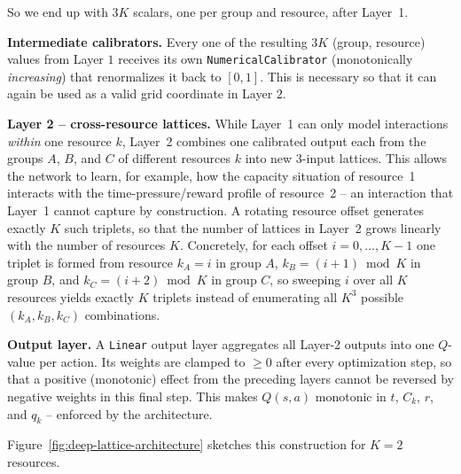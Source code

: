 So we end up with $3K$ scalars, one per group and resource, after Layer~1. 

\textbf{Intermediate calibrators.} Every one of the resulting $3K$ (group, resource) values from
Layer $1$ receives its own \texttt{NumericalCalibrator} (monotonically \emph{increasing}) that
renormalizes it back to $[0,1]$. This is necessary so that it can again be used as a valid grid
coordinate in Layer $2$.

\textbf{Layer 2 -- cross-resource lattices.} While Layer~1 can only model interactions
\emph{within} one resource $k$, Layer~2 combines one calibrated output each from the
groups $A$, $B$, and $C$ of different resources $k$ into new 3-input lattices. This allows the
network to learn, for example, how the capacity situation of resource~1 interacts with the
time-pressure/reward profile of resource~2 -- an interaction that Layer~1 cannot capture by
construction. A rotating resource offset generates exactly $K$ such triplets, so that the number of
lattices in Layer~2 grows linearly with the number of resources $K$. Concretely, for each offset
$i=0,\dots,K-1$ one triplet is formed from resource $k_A=i$ in group $A$, $k_B=(i+1)\bmod K$ in
group $B$, and $k_C=(i+2)\bmod K$ in group $C$, so sweeping $i$ over all $K$ resources yields
exactly $K$ triplets instead of enumerating all $K^3$ possible $(k_A,k_B,k_C)$ combinations.

\textbf{Output layer.} A \texttt{Linear} output layer aggregates all Layer-2 outputs into one $Q$-value
per action. Its weights are clamped to $\geq 0$ after every optimization step, so that a positive (monotonic) effect from the preceding layers
cannot be reversed by negative weights in this final step. This makes $Q(s,a)$ monotonic in $t$, $C_k$, $r$, and $q_k$ -- enforced by the architecture.

Figure~\ref{fig:deep-lattice-architecture} sketches this construction for $K=2$ resources.


